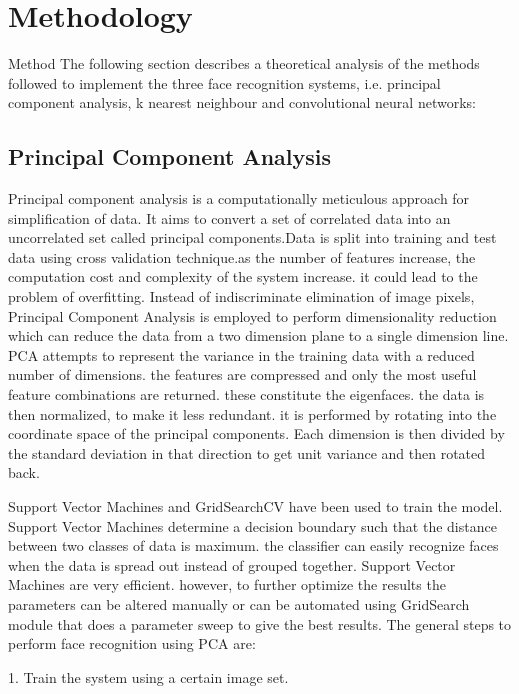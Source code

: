 \documentclass[conference]{IEEEtran}
\begin{document}
\section{Methodology}
\label{sec:3 Methodology} 
Method
The following section describes a theoretical analysis of the methods followed to implement the three face recognition systems, i.e. principal component analysis, k nearest neighbour and convolutional neural networks:



 

\subsection{Principal Component Analysis}
\label{subsec:3.1 Principal Component Analysis}
Principal component analysis is a computationally meticulous approach for simplification of data. It aims to convert a set of correlated data into an uncorrelated set called principal components\cite{turk1991face}.Data is split into training and test data using cross validation technique.as the number of features increase, the computation cost and complexity of the system increase. it could lead to the problem of overfitting. Instead of indiscriminate elimination of image pixels,  Principal Component Analysis is employed to perform dimensionality reduction which can reduce the data from a two dimension plane to a single dimension line. PCA attempts to represent the variance in the training data with a reduced number of dimensions.  the features are compressed and only the most useful feature combinations are returned. these constitute the eigenfaces. the data is then normalized, to make it less redundant. it is performed by rotating into the coordinate space of the principal components. Each dimension is then divided by the standard deviation in that direction to get unit variance and then rotated back. 

Support Vector Machines and GridSearchCV have been used to train the model. Support Vector Machines determine a decision boundary such that the distance between two classes of data is maximum. the classifier can easily recognize faces when the data is spread out instead of grouped together. Support Vector Machines are very efficient. however, to further optimize the results the parameters can be altered manually or can be automated using GridSearch module that does a parameter sweep to give the best results.
The general steps to perform face recognition using PCA are:

	1. Train the system using a certain image set.
    
\end{document}
